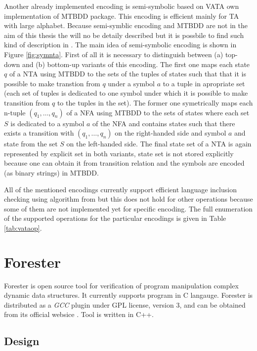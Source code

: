 Another already implemented encoding is semi-symbolic based on VATA own implementation of MTBDD package.
This encoding is efficient mainly for TA with large alphabet.
Because semi-symblic encoding and MTBDD are not in the aim of this thesis the will no be detaily described
but it is possbile to find such kind of description in \cite{lengal10}.
The main idea of semi-symbolic encoding is shown in Figure \ref{fig:symnta}.
First of all it is necessary to distinguish between (a) top-down and (b) bottom-up variants of this encoding.
The first one maps each state $q$ of a NTA using MTBDD to the sets of the tuples of states such that that it is possible
to make transtion from $q$ under a symbol $a$ to a tuple in apropriate set (each set of tuples is dedicated
to one symbol under which it is possible to make transition from $q$ to the tuples in the set).
The former one symetrically maps each n-tuple $(q_1,\ldots,q_n)$ of a NFA using MTBDD to the sets of states
where each set $S$ is dedicated to a symbol $a$ of the NFA and contains states such that there exists a transition
with $(q_1,\ldots,q_n)$ on the right-handed side and symbol $a$ and state from the set $S$ on the left-handed side.
The final state set of a NTA is again represented by explicit set in both variants,
state set is not stored explicitly because one can obtain it from transition relation and
the symbols are encoded (as binary strings) in MTBDD.

All of the mentioned encodings currently support efficient language inclusion checking using algorithm
from \cite{tacas10} but this does not hold for other operations because some of them are not implemented yet for specific encoding.
The full enumeration of the supported operations for the particular encodings is given in Table \ref{tab:vataop}.



\section{Forester}
\label{sec:FA}

Forester is open source tool for verification of program manipulation complex dynamic data structures.
It currently supports program in C langauge.
Forester is distributed as a \emph{GCC} plugin under GPL license, version 3, and can be obtained from its official websice \cite{www.:forester}.
Tool is written in C++.

\subsection{Design}


